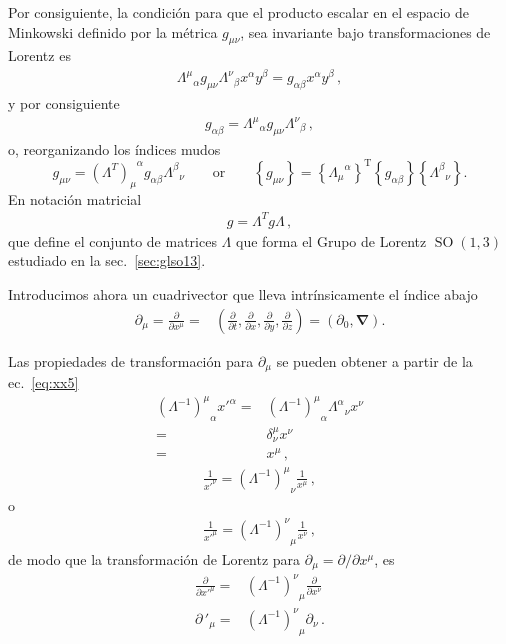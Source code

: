 \begin{frame}
Por consiguiente, la condición para que el producto escalar  en el espacio de Minkowski definido por la métrica $g_{\mu\nu}$, sea invariante bajo transformaciones de Lorentz es
\begin{align}
  {\Lambda^{\mu}}_{\alpha}g_{\mu\nu}{\Lambda^{\nu}}_{\beta}x^{\alpha}y^{\beta}=
  g_{\alpha\beta}x^{\alpha}y^{\beta}\,,
\end{align}
y por consiguiente
\begin{align}
  g_{\alpha\beta}={\Lambda^{\mu}}_{\alpha}g_{\mu\nu}{\Lambda^{\nu}}_{\beta}\,,
\end{align}
o, reorganizando los índices mudos
\begin{equation}
  \label{eq:lrinv}
  g_{\mu\nu}={(\Lambda^{T})_{\mu}}^\alpha g_{\alpha\beta}{\Lambda^\beta}_{\nu}\qquad\text{or}\qquad 
\left\{g_{\mu\nu}\right\}=\left\{{\Lambda_{\mu}}^{\alpha}\right\}^{\text{T}}\left\{g_{\alpha\beta}\right\}\left\{{\Lambda^\beta}_{\nu}\right\}.
\end{equation}
En notaci\'on matricial
\begin{align}
 g=\Lambda^T g \Lambda\,,
\end{align}
que define el conjunto de matrices $\Lambda$ que forma el Grupo de Lorentz $\operatorname{SO}(1,3)$ estudiado en la sec.~\ref{sec:glso13}.

Introducimos ahora un cuadrivector que lleva intrínsicamente el índice abajo
\begin{align}
   \partial_\mu=\frac{\partial}{\partial x^\mu}=&\left(
    \frac{\partial}{\partial t},\frac{\partial}{\partial x},\frac{\partial}{\partial y},\frac{\partial}{\partial z}
  \right)
  =(\partial_0,\boldsymbol{\nabla}).
\end{align}



Las propiedades de transformación para $\partial_\mu$ se pueden obtener a partir de la ec.~\eqref{eq:xx5}
\begin{align}
  {\left(\Lambda^{-1}\right)^\mu}_\alpha{x'}^\alpha=&{\left(\Lambda^{-1}\right)^\mu}_\alpha{\Lambda^\alpha}_\nu x^\nu\nonumber\\
=&\delta^\mu_\nu x^\nu\nonumber\\
=&x^\mu\,,
\end{align}
\begin{align}
  \frac{1}{{x'}^\nu}= {\left(\Lambda^{-1}\right)^\mu}_\nu\frac{1}{x^\mu}\,,
\end{align}
o
\begin{align}
  \label{eq:183qft}
    \frac{1}{{x'}^\mu}= {\left(\Lambda^{-1}\right)^\nu}_\mu\frac{1}{x^\nu}\,,
\end{align}
de modo que la transformación de Lorentz para $\partial_\mu=\partial/\partial x^\mu$, es
\begin{align}
  \label{eq:dmulrtran}
   \frac{\partial}{{\partial x'}^\mu}=& {\left(\Lambda^{-1}\right)^\nu}_\mu\frac{\partial}{\partial x^\nu}\nonumber\\
   {\partial\,}'_\mu=& {\left(\Lambda^{-1}\right)^\nu}_\mu\partial_\nu\,.
\end{align}


\end{frame}
